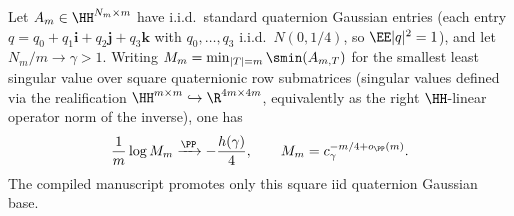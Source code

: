 
\begin{theorem}\label{thm:quaternion-gaussian-base}
Let $A_m\in\HH^{N_m\times m}$ have i.i.d.\ standard quaternion Gaussian entries
(each entry $q=q_0+q_1\mathbf i+q_2\mathbf j+q_3\mathbf k$ with $q_0,\dots,q_3$
i.i.d.\ $N(0,1/4)$, so $\EE|q|^2=1$), and let $N_m/m\to\gamma>1$.  Writing
$M_m=\min_{|T|=m}\smin(A_{m,T})$ for the smallest least singular value over square
quaternionic row submatrices (singular values defined via the realification
$\HH^{m\times m}\hookrightarrow\R^{4m\times 4m}$, equivalently as the right
$\HH$-linear operator norm of the inverse), one has
\[
  \frac1m\log M_m\xrightarrow{\PP}-\frac{h(\gamma)}{4},
  \qquad M_m=c_\gamma^{-m/4+o_\PP(m)} .
\]
The compiled manuscript promotes only this square iid quaternion Gaussian base.
\end{theorem}

